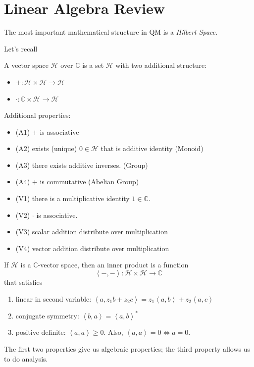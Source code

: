 \section{Linear Algebra Review}

The most important mathematical structure in QM is a \textit{Hilbert Space}.

Let's recall

\begin{definition}
A vector space $\mathscr{H}$ over $\mathbb{C}$ is a set $\mathscr{H}$ with two additional structure:
\begin{itemize}
	\item  $+: \mathscr{H} \times \mathscr{H} \to  \mathscr{H}$
	\item $\cdot : \mathbb{C} \times  \mathscr{H} \to  \mathscr{H}$
\end{itemize}
Additional properties:
\begin{itemize}
	\item (A1) $+$ is associative
	\item (A2) exists (unique)  $0 \in  \mathscr{H}$ that is additive identity (Monoid)
	\item (A3) there exists additive inverses. (Group)
	\item (A4) $+$ is commutative (Abelian Group)
	\item (V1) there is a multiplicative identity $1 \in \mathbb{C}$.
	\item (V2) $\cdot$ is associative.
	\item (V3) scalar addition distribute over multiplication
	\item (V4) vector addition distribute over multiplication
\end{itemize}
\end{definition}

\begin{definition}
	If $\mathscr{H}$ is a $\mathbb{C}$-vector space, then an inner product is a function
	\[
		\left\langle -, - \right\rangle : \mathscr{H} \times \mathscr{H} \to \mathbb{C}
	\] 
	that satisfies
	\begin{enumerate}
		\item linear in second variable: $\left\langle a, z_1 b + z_2 c \right\rangle = z_1 \left\langle a, b \right\rangle  + z_2 \left\langle a, c \right\rangle $
		\item conjugate symmetry: $\left\langle b, a \right\rangle  = \left\langle a, b \right\rangle^{*}$
		\item positive definite: $\left\langle a, a \right\rangle \ge 0$. Also, $\left\langle a, a \right\rangle =0 \iff  a =0$.
	\end{enumerate}
\end{definition}
The first two properties give us algebraic properties; the third property allows us to do analysis. 


